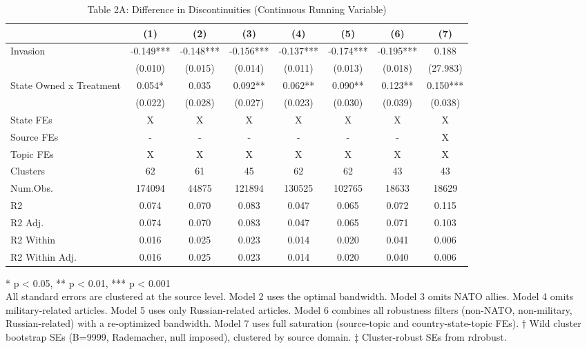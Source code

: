 \begin{table}[t]
\caption{\label{tab:table2a}Table 2A: Difference in Discontinuities (Continuous Running Variable)} 
\fontsize{12.0pt}{14.0pt}\selectfont
\begin{tabular*}{\linewidth}{@{\extracolsep{\fill}}lccccccc}
\toprule
  & (1) & (2) & (3) & (4) & (5) & (6) & (7) \\ 
\midrule\addlinespace[2.5pt]
Invasion & -0.149*** & -0.148*** & -0.156*** & -0.137*** & -0.174*** & -0.195*** & 0.188 \\ 
 & (0.010) & (0.015) & (0.014) & (0.011) & (0.013) & (0.018) & (27.983) \\ 
State Owned x Treatment & 0.054* & 0.035 & 0.092** & 0.062** & 0.090** & 0.123** & 0.150*** \\ 
{} & {(0.022)} & {(0.028)} & {(0.027)} & {(0.023)} & {(0.030)} & {(0.039)} & {(0.038)} \\ 
State FEs & X & X & X & X & X & X & X \\ 
Source FEs & - & - & - & - & - & - & X \\ 
Topic FEs & X & X & X & X & X & X & X \\ 
Clusters & 62 & 61 & 45 & 62 & 62 & 43 & 43 \\ 
Num.Obs. & 174094 & 44875 & 121894 & 130525 & 102765 & 18633 & 18629 \\ 
R2 & 0.074 & 0.070 & 0.083 & 0.047 & 0.065 & 0.072 & 0.115 \\ 
R2 Adj. & 0.074 & 0.070 & 0.083 & 0.047 & 0.065 & 0.071 & 0.103 \\ 
R2 Within & 0.016 & 0.025 & 0.023 & 0.014 & 0.020 & 0.041 & 0.006 \\ 
R2 Within Adj. & 0.016 & 0.025 & 0.023 & 0.014 & 0.020 & 0.040 & 0.006 \\ 
\bottomrule
\end{tabular*}
\begin{minipage}{\linewidth}
\vspace{.05em}
* p < 0.05, ** p < 0.01, *** p < 0.001\\
All standard errors are clustered at the source level. Model 2 uses the optimal
bandwidth. Model 3 omits NATO allies. Model 4 omits military-related articles.
Model 5 uses only Russian-related articles. Model 6 combines all robustness
filters (non-NATO, non-military, Russian-related) with a re-optimized bandwidth.
Model 7 uses full saturation (source-topic and country-state-topic FEs). † Wild
cluster bootstrap SEs (B=9999, Rademacher, null imposed), clustered by source
domain. ‡ Cluster-robust SEs from rdrobust.\\
\end{minipage}
\end{table}

